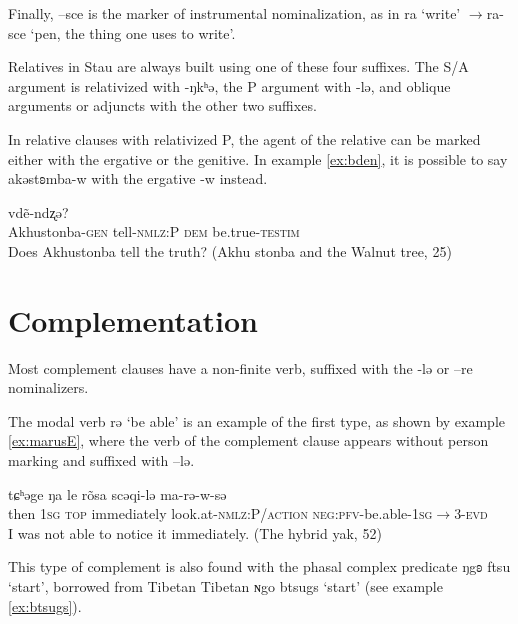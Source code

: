 \documentclass[oneside,a4paper,11pt]{article}
\newcommand{\ipa}[1]{{\phon #1}} %
\begin{document}
Finally, \ipa{--sce} is the marker of instrumental nominalization, as in \ipa{ra} `write' $\rightarrow$\ipa{ra-sce} `pen, the thing one uses to write'.

Relatives in Stau are always built using one of these four suffixes. The S/A  argument is relativized with \ipa{-ŋkʰə}, the P argument with \ipa{-lə}, and oblique arguments or adjuncts with the other two suffixes. 

In relative clauses with relativized P, the agent of the relative can be marked either with the ergative or the genitive. In example \ref{ex:bden}, it is possible to say  \ipa{akəstʚmba-w} with the ergative \ipa{-w} instead.

\begin{exe}
\ex \label{ex:bden}
\gll 
 [\ipa{akəstʚmba-j} 	\ipa{fɕe-lə}] 	\ipa{de} 	\ipa{vdẽ-ndʐə?} \\
 Akhustonba-\textsc{gen} tell-\textsc{nmlz:P} \textsc{dem} be.true-\textsc{testim} \\
\glt Does Akhustonba tell the truth? (Akhu stonba and the Walnut tree, 25)
\end{exe}

 
 

\section{Complementation}  
Most complement clauses have a non-finite verb, suffixed with the \ipa{-lə} or \ipa{--re} nominalizers.

The modal verb \ipa{rə} `be able' is an example of the first type, as shown by example \ref{ex:marusE}, where the verb of the complement clause appears without person marking and suffixed with \ipa{--lə}.

\begin{exe}
\ex\label{ex:marusE}
\gll
\ipa{tɕʰəge} 	\ipa{ŋa} 	\ipa{le} 	\ipa{rõsa} 	\ipa{scəqi-lə} 	\ipa{ma-rə-w-sə} \\
then \textsc{1sg} \textsc{top} immediately look.at-\textsc{nmlz:P/action} \textsc{neg:pfv}-be.able-\textsc{1sg}$\rightarrow$3-\textsc{evd} \\
\glt I was not able to notice it immediately. (The hybrid yak, 52)
\end{exe}

This type of complement is also found with the phasal complex predicate \ipa{ŋgʚ} \ipa{ftsu} `start', borrowed from Tibetan Tibetan \ipa{ɴgo btsugs} `start' (see example \ref{ex:btsugs}).
\end{document}
